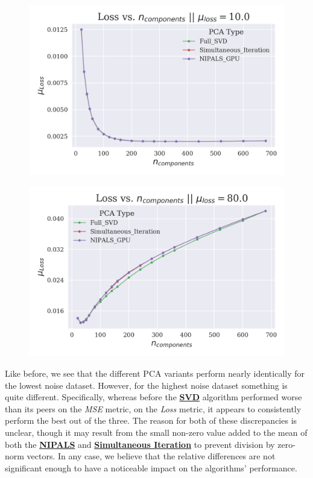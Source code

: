 \documentclass[12pt]{article}
\begin{document}
\begin{figure}[H]
\centering
\begin{minipage}{.45\textwidth}
  \centering
  \includegraphics[width=\linewidth]{Noise10Loss.png}
  \label{Noise10Loss}
\end{minipage}%
\quad
\begin{minipage}{.45\textwidth}
  \centering
  \includegraphics[width=\linewidth]{Noise80Loss.png}
  \label{Noise80Loss}
\end{minipage}
\end{figure}

Like before, we see that the different PCA variants perform nearly identically for the lowest noise dataset. However, for the highest noise dataset something is quite different. Specifically, whereas before the \textbf{\hyperref[3.2]{SVD}} algorithm performed worse than its peers on the \textit{MSE} metric, on the \textit{Loss} metric, it appears to consistently perform the best out of the three. The reason for both of these discrepancies is unclear, though it may result from the small non-zero value added to the mean of both the \textbf{\hyperref[3.1]{NIPALS}} and  \textbf{\hyperref[3.3]{Simultaneous Iteration}} to prevent division by zero-norm vectors. In any case, we believe that the relative differences are not significant enough to have a noticeable impact on the algorithms' performance.
\end{document}
